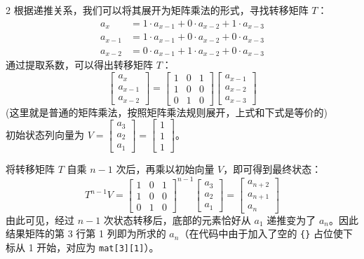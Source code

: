 \begin{multicols*}{2}
		根据递推关系，我们可以将其展开为矩阵乘法的形式，寻找转移矩阵 $T$：
		\[
			\begin{aligned}
				a_x     & = 1 \cdot a_{x-1} + 0 \cdot a_{x-2} + 1 \cdot a_{x-3} \\
				a_{x-1} & = 1 \cdot a_{x-1} + 0 \cdot a_{x-2} + 0 \cdot a_{x-3} \\
				a_{x-2} & = 0 \cdot a_{x-1} + 1 \cdot a_{x-2} + 0 \cdot a_{x-3}
			\end{aligned}
		\]
		通过提取系数，可以得出转移矩阵 $T$：
		\[
			\begin{bmatrix}
				a_x \\ a_{x-1} \\ a_{x-2}
			\end{bmatrix} = \begin{bmatrix}
								1 & 0 & 1 \\ 1 & 0 & 0 \\ 0 & 1 & 0
			\end{bmatrix} \begin{bmatrix}
							  a_{x-1} \\ a_{x-2} \\ a_{x-3}
			\end{bmatrix}
		\]
		(这里就是普通的矩阵乘法，按照矩阵乘法规则展开，上式和下式是等价的)
		\\
		初始状态列向量为 $V = \begin{bmatrix}
								  a_3 \\ a_2 \\ a_1
		\end{bmatrix} = \begin{bmatrix}
							1 \\ 1 \\ 1
		\end{bmatrix}$。

		将转移矩阵 $T$ 自乘 $n-1$ 次后，再乘以初始向量 $V$，即可得到最终状态：
		\[
			T^{n-1} V = \begin{bmatrix}
							1 & 0 & 1 \\ 1 & 0 & 0 \\ 0 & 1 & 0
			\end{bmatrix}^{n-1} \begin{bmatrix}
									a_3 \\ a_2 \\ a_1
			\end{bmatrix} = \begin{bmatrix}
								a_{n+2} \\ a_{n+1} \\ a_n
			\end{bmatrix}
		\]
		由此可见，经过 $n-1$ 次状态转移后，底部的元素恰好从 $a_1$ 递推变为了 $a_n$。因此结果矩阵的第 3 行第 1 列即为所求的 $a_n$（在代码中由于加入了空的 \verb|{}| 占位使下标从 1 开始，对应为 \verb|mat[3][1]|）。



\end{multicols*}

